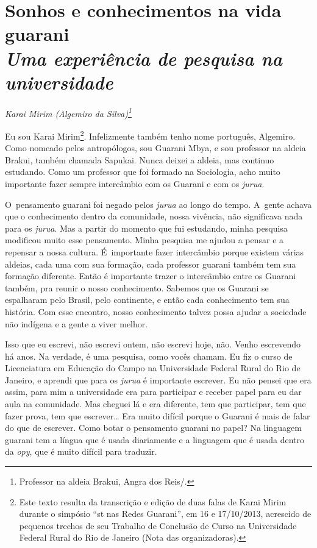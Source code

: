 
\chapter*{Sonhos e conhecimentos na vida guarani\\
\large{\emph{Uma experiência de pesquisa na universidade}}}


\@openrighttrue\makeatother
\begin{flushright}
\emph{Karai Mirim (Algemiro da Silva)\footnote{Professor na aldeia Brakui,
Angra dos Reis/.}}
\end{flushright} 

\noindent
Eu sou Karai Mirim\footnote{Este texto resulta da transcrição e edição
de duas falas de Karai Mirim durante o simpósio ``st nas Redes
Guarani'', em 16 e 17/10/2013, acrescido de pequenos trechos de seu
Trabalho de Conclusão de Curso na Universidade Federal Rural do Rio de
Janeiro (Nota das organizadoras).}. Infelizmente também tenho nome
português, Algemiro. Como nomeado pelos antropólogos, sou Guarani Mbya,
e sou professor na aldeia Brakui, também chamada Sapukai. Nunca deixei
a aldeia, mas continuo estudando. Como um professor que foi formado na
Sociologia, acho muito importante fazer sempre intercâmbio com os
Guarani e com os \emph{jurua}.

O~pensamento guarani foi negado pelos \emph{jurua} ao longo do tempo. A~gente
achava que o conhecimento dentro da comunidade, nossa vivência, não
significava nada para os \emph{jurua}. Mas a partir do momento que fui
estudando, minha pesquisa modificou muito esse pensamento. Minha
pesquisa me ajudou a pensar e a repensar a nossa cultura. É~importante
fazer intercâmbio porque existem várias aldeias, cada uma com sua
formação, cada professor guarani também tem sua formação diferente.
Então é importante trazer o intercâmbio entre os Guarani também, pra
reunir o nosso conhecimento. Sabemos que os Guarani se espalharam pelo
Brasil, pelo continente, e então cada conhecimento tem sua história.
Com esse encontro, nosso conhecimento talvez possa ajudar a sociedade
não indígena e a gente a viver melhor.

Isso que eu escrevi, não escrevi ontem, não escrevi hoje, não. Venho
escrevendo há anos. Na verdade, é uma pesquisa, como vocês chamam. Eu
fiz o curso de Licenciatura em Educação do Campo na Universidade
Federal Rural do Rio de Janeiro, e aprendi que para os \emph{jurua} é
importante escrever. Eu não pensei que era assim, para mim a
universidade era para participar e receber papel para eu dar aula na
comunidade. Mas cheguei lá e era diferente, tem que participar, tem que
fazer prova, tem que escrever\ldots{} Era muito difícil porque o Guarani é
mais de falar do que de escrever. Como botar o pensamento guarani no
papel? Na linguagem guarani tem a língua que é usada diariamente e a
linguagem que é usada dentro da \emph{opy}, que é muito difícil para traduzir.

